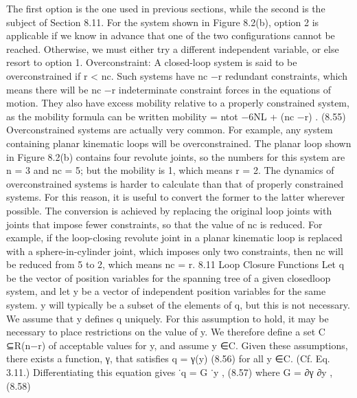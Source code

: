The first option is the one used in previous sections, while the second is the subject of Section 8.11. For the system shown in Figure 8.2(b), option 2 is applicable if we know in advance that one of the two configurations cannot be reached. Otherwise, we must either try a different independent variable, or else resort to option 1. Overconstraint: A closed-loop system is said to be overconstrained if r < nc. Such systems have nc −r redundant constraints, which means there will be nc −r indeterminate constraint forces in the equations of motion. They also have excess mobility relative to a properly constrained system, as the mobility formula can be written mobility = ntot −6NL + (nc −r) . (8.55) Overconstrained systems are actually very common. For example, any system containing planar kinematic loops will be overconstrained. The planar loop shown in Figure 8.2(b) contains four revolute joints, so the numbers for this system are n = 3 and nc = 5; but the mobility is 1, which means r = 2. The dynamics of overconstrained systems is harder to calculate than that of properly constrained systems. For this reason, it is useful to convert the former to the latter wherever possible. The conversion is achieved by replacing the original loop joints with joints that impose fewer constraints, so that the value of nc is reduced. For example, if the loop-closing revolute joint in a planar kinematic loop is replaced with a sphere-in-cylinder joint, which imposes only two constraints, then nc will be reduced from 5 to 2, which means nc = r. 8.11 Loop Closure Functions Let q be the vector of position variables for the spanning tree of a given closedloop system, and let y be a vector of independent position variables for the same system. y will typically be a subset of the elements of q, but this is not necessary. We assume that y defines q uniquely. For this assumption to hold, it may be necessary to place restrictions on the value of y. We therefore define a set C ⊆R(n−r) of acceptable values for y, and assume y ∈C. Given these assumptions, there exists a function, γ, that satisfies q = γ(y) (8.56) for all y ∈C. (Cf. Eq. 3.11.) Differentiating this equation gives ˙q = G ˙y , (8.57) where G = ∂γ ∂y , (8.58)

